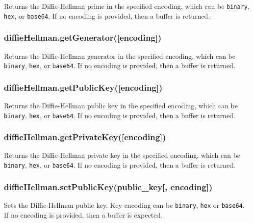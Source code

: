 Returns the Diffie-Hellman prime in the specified encoding, which can be
\texttt{\textquotesingle{}binary\textquotesingle{}},
\texttt{\textquotesingle{}hex\textquotesingle{}}, or
\texttt{\textquotesingle{}base64\textquotesingle{}}. If no encoding is
provided, then a buffer is returned.

\subsubsection{diffieHellman.getGenerator({[}encoding{]})}\label{diffiehellman.getgeneratorencoding}

Returns the Diffie-Hellman generator in the specified encoding, which
can be \texttt{\textquotesingle{}binary\textquotesingle{}},
\texttt{\textquotesingle{}hex\textquotesingle{}}, or
\texttt{\textquotesingle{}base64\textquotesingle{}}. If no encoding is
provided, then a buffer is returned.

\subsubsection{diffieHellman.getPublicKey({[}encoding{]})}\label{diffiehellman.getpublickeyencoding}

Returns the Diffie-Hellman public key in the specified encoding, which
can be \texttt{\textquotesingle{}binary\textquotesingle{}},
\texttt{\textquotesingle{}hex\textquotesingle{}}, or
\texttt{\textquotesingle{}base64\textquotesingle{}}. If no encoding is
provided, then a buffer is returned.

\subsubsection{diffieHellman.getPrivateKey({[}encoding{]})}\label{diffiehellman.getprivatekeyencoding}

Returns the Diffie-Hellman private key in the specified encoding, which
can be \texttt{\textquotesingle{}binary\textquotesingle{}},
\texttt{\textquotesingle{}hex\textquotesingle{}}, or
\texttt{\textquotesingle{}base64\textquotesingle{}}. If no encoding is
provided, then a buffer is returned.

\subsubsection{diffieHellman.setPublicKey(public\_key{[},
encoding{]})}\label{diffiehellman.setpublickeypublicux5fkey-encoding}

Sets the Diffie-Hellman public key. Key encoding can be
\texttt{\textquotesingle{}binary\textquotesingle{}},
\texttt{\textquotesingle{}hex\textquotesingle{}} or
\texttt{\textquotesingle{}base64\textquotesingle{}}. If no encoding is
provided, then a buffer is expected.

